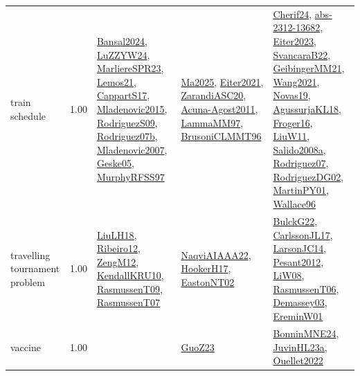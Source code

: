 {\begin{longtable}{p{3cm}r>{\raggedright\arraybackslash}p{6cm}>{\raggedright\arraybackslash}p{6cm}>{\raggedright\arraybackslash}p{8cm}}
\index{train schedule}\index{ApplicationAreas!train schedule}train schedule &  1.00 & \hyperref[detail:Bansal2024]{Bansal2024}, \hyperref[detail:LuZZYW24]{LuZZYW24}, \hyperref[detail:MarliereSPR23]{MarliereSPR23}, \hyperref[detail:Lemos21]{Lemos21}, \hyperref[detail:CappartS17]{CappartS17}, \hyperref[detail:Mladenovic2015]{Mladenovic2015}, \hyperref[detail:RodriguezS09]{RodriguezS09}, \hyperref[detail:Rodriguez07b]{Rodriguez07b}, \hyperref[detail:Mladenovic2007]{Mladenovic2007}, \hyperref[detail:Geske05]{Geske05}, \hyperref[detail:MurphyRFSS97]{MurphyRFSS97} & \hyperref[detail:Ma2025]{Ma2025}, \hyperref[detail:Eiter2021]{Eiter2021}, \hyperref[detail:ZarandiASC20]{ZarandiASC20}, \hyperref[detail:Acuna-Agost2011]{Acuna-Agost2011}, \hyperref[detail:LammaMM97]{LammaMM97}, \hyperref[detail:BrusoniCLMMT96]{BrusoniCLMMT96} & \hyperref[detail:Cherif24]{Cherif24}, \hyperref[detail:abs-2312-13682]{abs-2312-13682}, \hyperref[detail:Eiter2023]{Eiter2023}, \hyperref[detail:SvancaraB22]{SvancaraB22}, \hyperref[detail:GeibingerMM21]{GeibingerMM21}, \hyperref[detail:Wang2021]{Wang2021}, \hyperref[detail:Novas19]{Novas19}, \hyperref[detail:AgussurjaKL18]{AgussurjaKL18}, \hyperref[detail:Froger16]{Froger16}, \hyperref[detail:LiuW11]{LiuW11}, \hyperref[detail:Salido2008a]{Salido2008a}, \hyperref[detail:Rodriguez07]{Rodriguez07}, \hyperref[detail:RodriguezDG02]{RodriguezDG02}, \hyperref[detail:MartinPY01]{MartinPY01}, \hyperref[detail:Wallace96]{Wallace96}\\
\index{travelling tournament problem}\index{ApplicationAreas!travelling tournament problem}travelling tournament problem &  1.00 & \hyperref[detail:LiuLH18]{LiuLH18}, \hyperref[detail:Ribeiro12]{Ribeiro12}, \hyperref[detail:ZengM12]{ZengM12}, \hyperref[detail:KendallKRU10]{KendallKRU10}, \hyperref[detail:RasmussenT09]{RasmussenT09}, \hyperref[detail:RasmussenT07]{RasmussenT07} & \hyperref[detail:NaqviAIAAA22]{NaqviAIAAA22}, \hyperref[detail:HookerH17]{HookerH17}, \hyperref[detail:EastonNT02]{EastonNT02} & \hyperref[detail:BulckG22]{BulckG22}, \hyperref[detail:CarlssonJL17]{CarlssonJL17}, \hyperref[detail:LarsonJC14]{LarsonJC14}, \hyperref[detail:Pesant2012]{Pesant2012}, \hyperref[detail:LiW08]{LiW08}, \hyperref[detail:RasmussenT06]{RasmussenT06}, \hyperref[detail:Demassey03]{Demassey03}, \hyperref[detail:EreminW01]{EreminW01}\\
\index{vaccine}\index{ApplicationAreas!vaccine}vaccine &  1.00 &  & \hyperref[detail:GuoZ23]{GuoZ23} & \hyperref[detail:BonninMNE24]{BonninMNE24}, \hyperref[detail:JuvinHL23a]{JuvinHL23a}, \hyperref[detail:Ouellet2022]{Ouellet2022}\\

\end{longtable}}
